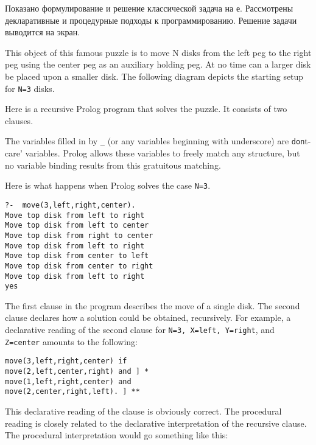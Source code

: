 
Показано формулирование и решение классической задача на \prolog е. Рассмотрены
декларативные и процедурные подходы к программированию. Решение задачи выводится
на экран.

This object of this famous puzzle is to move N disks from the left peg to the
right peg using the center peg as an auxiliary holding peg. At no time can a
larger disk be placed upon a smaller disk. The following diagram depicts the
starting setup for \verb|N=3| disks.


Here is a recursive Prolog program that solves the puzzle. It consists of two
clauses.


The variables filled in by \verb'_' (or any variables beginning with underscore)
are \verb'don't-care' variables. Prolog allows these variables to freely match
any structure, but no variable binding results from this gratuitous matching.

Here is what happens when Prolog solves the case \verb|N=3|.

\begin{verbatim}
?-  move(3,left,right,center). 
Move top disk from left to right 
Move top disk from left to center 
Move top disk from right to center 
Move top disk from left to right 
Move top disk from center to left 
Move top disk from center to right 
Move top disk from left to right 
yes
\end{verbatim}

The first clause in the program describes the move of a single disk. The second
clause declares how a solution could be obtained, recursively. For example, a
declarative reading of the second clause for \verb|N=3, X=left, Y=right|, and
\verb|Z=center| amounts to the following:

\begin{verbatim}
move(3,left,right,center) if 
move(2,left,center,right) and ] * 
move(1,left,right,center) and 
move(2,center,right,left). ] ** 
\end{verbatim}

This declarative reading of the clause is obviously correct. The procedural
reading is closely related to the declarative interpretation of the recursive
clause. The procedural interpretation would go something like this:

